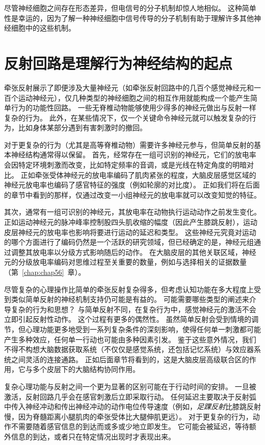 尽管神经细胞之间存在形态差异，但电信号的分子机制却惊人地相似。 
这种简单性是幸运的，因为了解一种神经细胞中信号传导的分子机制有助于理解许多其他神经细胞中的这些机制。


\section{反射回路是理解行为神经结构的起点}
牵张反射展示了即便涉及大量神经元（如牵张反射回路中的几百个感觉神经元和一百个运动神经元），仅几种类型的神经细胞之间的相互作用就能构成一个能产生简单行为的功能性回路。
一些无脊椎动物能够使用少得多的神经元做出与反射一样复杂的行为。 
此外，在某些情况下，仅一个关键命令神经元就可以触发复杂的行为，比如身体某部分遇到有害刺激时的撤回。


对于更复杂的行为（尤其是高等脊椎动物）需要许多神经元参与，但简单反射的基本神经结构通常得以保留。
首先，经常存在一组可识别的神经元，它们的放电率会因特定环境刺激而改变，比如特定频率的音调，或是光线在特定角度的明暗对比。
正如牵张受体神经元的放电率编码了肌肉紧张的程度，大脑皮层感觉区域的神经元放电率也编码了感官特征的强度（例如轮廓的对比度）。 
正如我们将在后面的章节中看到的那样，仅通过改变一小组神经元的放电率就可以改变知觉的特征。


其次，通常有一组可识别的神经元，其放电率在动物执行运动动作之前发生变化。 
正如运动神经元的脉冲峰率控制股四头肌收缩的幅度（因此产生膝跳反射），运动皮层神经元的放电率也影响将要进行运动的延迟和类型。
这些神经元究竟对运动的哪个方面进行了编码仍然是一个活跃的研究领域，但已经确定的是，神经元组通过调整其放电率以分级方式影响随后的动作。 
在大脑皮层的其他关联区域，神经元的分级放电率编码对思维过程至关重要的数量，例如与选择相关的证据数量（第~\ref{chap:chap56}~章）。


尽管复杂的心理操作比简单的牵张反射复杂得多，但考虑认知功能在多大程度上受到类似简单反射的神经机制支持仍可能是有益的。 
可能需要哪些类型的阐述来介导复杂的行为和思想？
与简单反射不同，在复杂行为中，感觉神经元的激活不会立即引起反射性动作。
这个过程有更多的偶然性。 
虽然简单反射会受到情境的调节，但心理功能更多地受到一系列复杂条件的深刻影响，使得任何单一刺激都可能产生多种效应，任何单一行动也可能由多种因素引发。 
鉴于这些意外情况，我们不得不构想大脑数据获取系统（不仅仅是感觉系统，还包括记忆系统）与效应器系统之间灵活的连接通路。
正如后面章节将看到的，这是大脑皮层高级联合区的作用，它与多个皮层下的大脑结构协同作用。


复杂心理功能与反射之间一个更为显著的区别可能在于行动时间的安排。
一旦被激活，反射回路几乎会在感官刺激后立即采取行动。 
任何延迟主要取决于反射弧中传入神经冲动和传出神经冲动的动作电位传导速度（例如，\textit{足踝反射}比膝跳反射慢，因为脊髓距离小腿肌肉的牵张受体比大腿伸肌更远）。
对于更复杂的行为，动作不需要随着感官信息的到达而或多或少地立即发生。 
它可能会被延迟，等待额外信息的到达，或者只在特定情况出现时才表现出来。


